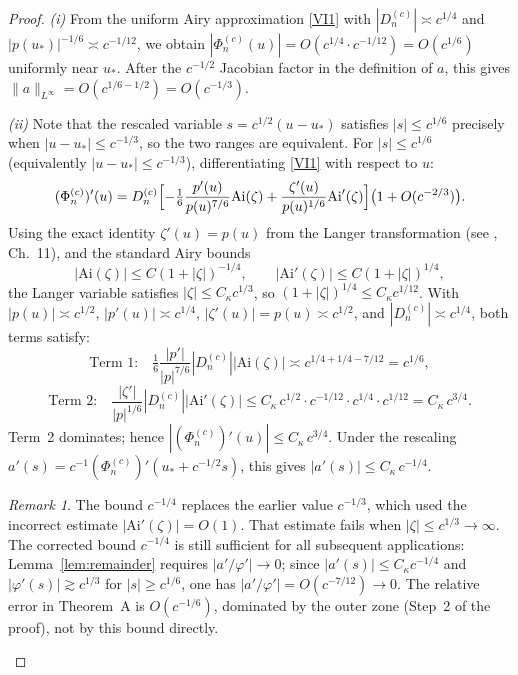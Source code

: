 \documentclass[12pt,a4paper]{amsart}
\theoremstyle{definition}
\theoremstyle{remark}
\newtheorem*{remark*}{Remark}
\newcommand{\Ai}{\mathrm{Ai}}
\newcommand{\ustar}{u_*}
\begin{document}
\begin{proof}
\textit{(i)} From the uniform Airy approximation
\eqref{VI1} with $|D_n^{(c)}| \asymp c^{1/4}$
and $|p(\ustar)|^{-1/6} \asymp c^{-1/12}$,
we obtain
$|\Phi_n^{(c)}(u)| = O(c^{1/4} \cdot c^{-1/12}) = O(c^{1/6})$
uniformly near $\ustar$.
After the $c^{-1/2}$ Jacobian factor in the definition of $a$,
this gives $\|a\|_{L^\infty} = O(c^{1/6-1/2}) = O(c^{-1/3})$.

\textit{(ii)} Note that the rescaled variable $s = c^{1/2}(u-\ustar)$
satisfies $|s| \le c^{1/6}$ precisely when
$|u - \ustar| \le c^{-1/3}$,
so the two ranges are equivalent.
For $|s| \le c^{1/6}$ (equivalently $|u-\ustar| \le c^{-1/3}$),
differentiating \eqref{VI1} with respect to $u$:
\[
  (\Phi_n^{(c)})'(u)
  = D_n^{(c)}\Bigl[
    -\tfrac{1}{6}\frac{p'(u)}{p(u)^{7/6}}\Ai(\zeta)
    + \frac{\zeta'(u)}{p(u)^{1/6}}\Ai'(\zeta)
  \Bigr]\bigl(1 + O(c^{-2/3})\bigr).
\]
Using the exact identity $\zeta'(u) = p(u)$
from the Langer transformation
(see \cite{Olver1974}, Ch.~11),
and the standard Airy bounds
\[
  |\Ai(\zeta)| \le C(1+|\zeta|)^{-1/4},
  \qquad
  |\Ai'(\zeta)| \le C(1+|\zeta|)^{1/4},
\]
the Langer variable satisfies
$|\zeta| \le C_\kappa c^{1/3}$,
so $(1+|\zeta|)^{1/4} \le C_\kappa c^{1/12}$.
With $|p(u)| \asymp c^{1/2}$,
$|p'(u)| \asymp c^{1/4}$,
$|\zeta'(u)| = p(u) \asymp c^{1/2}$,
and $|D_n^{(c)}| \asymp c^{1/4}$,
both terms satisfy:
\[
\text{Term 1:}\quad
\tfrac{1}{6}\frac{|p'|}{|p|^{7/6}}|D_n^{(c)}||\Ai(\zeta)|
\asymp c^{1/4+1/4-7/12} = c^{1/6},
\]
\[
\text{Term 2:}\quad
\frac{|\zeta'|}{|p|^{1/6}}|D_n^{(c)}||\Ai'(\zeta)|
\le C_\kappa\, c^{1/2} \cdot c^{-1/12} \cdot c^{1/4} \cdot c^{1/12}
= C_\kappa\, c^{3/4}.
\]
Term~2 dominates; hence
$|(\Phi_n^{(c)})'(u)| \le C_\kappa\,c^{3/4}$.
Under the rescaling
$a'(s) = c^{-1}(\Phi_n^{(c)})'(\ustar + c^{-1/2}s)$,
this gives $|a'(s)| \le C_\kappa\,c^{-1/4}$.

\begin{remark*}
The bound $c^{-1/4}$ replaces the earlier value
$c^{-1/3}$, which used the incorrect estimate
$|\Ai'(\zeta)| = O(1)$.
That estimate fails when $|\zeta| \le c^{1/3} \to \infty$.
The corrected bound $c^{-1/4}$ is still sufficient
for all subsequent applications: Lemma~\ref{lem:remainder}
requires $|a'/\varphi'| \to 0$; since
$|a'(s)| \le C_\kappa c^{-1/4}$ and
$|\varphi'(s)| \gtrsim c^{1/3}$ for $|s| \ge c^{1/6}$,
one has $|a'/\varphi'| = O(c^{-7/12}) \to 0$. \checkmark
The relative error in Theorem~A is $O(c^{-1/6})$,
dominated by the outer zone (Step~2 of the proof),
not by this bound directly.
\end{remark*}
\end{proof}
\end{document}
